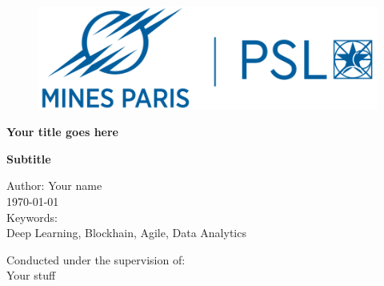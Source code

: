 \begin{titlepage}
    \begin{center}
    
        \begin{figure}[!htb]
          \centering
           \begin{minipage}{0.42\textwidth}
             \centering
             \includegraphics[width=\linewidth]{../figs/logo/mines.png}
           \end{minipage}\hfill
        \end{figure}

        \vspace*{2.8cm}
        \centering
        \LARGE  
        \textbf{Your title goes here}
        
        \vspace*{0.25cm}
        \large 
        \textbf{Subtitle}
        
        \vspace{3cm}
        \large
        Author: Your name\\
         
         \vspace{2cm}
         \large 
         \today \\
        
        \vspace{2cm}
        \large 
        Keywords:\\
        Deep Learning, Blockhain, Agile, Data Analytics
        
        \vspace{5.5cm}
        \normalsize
        Conducted under the supervision of: \\
            Your stuff
        
        
    \end{center}
\end{titlepage}

\thispagestyle{empty}
\cleardoublepage

